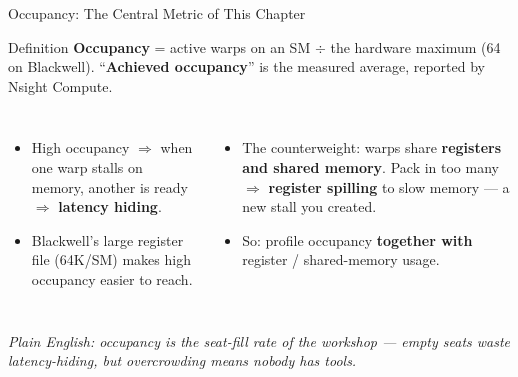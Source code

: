 \documentclass[aspectratio=169]{beamer}
\newcommand{\kw}[1]{\textbf{\textcolor{kwblue}{#1}}}
\newcommand{\pe}[1]{{\footnotesize\itshape Plain English: #1}}
\begin{document}
\begin{frame}{Occupancy: The Central Metric of This Chapter}
  \begin{block}{Definition}
    \kw{Occupancy} = active warps on an SM $\div$ the hardware maximum (64 on Blackwell).
    ``\kw{Achieved occupancy}'' is the measured average, reported by Nsight Compute.
  \end{block}
  \begin{columns}[t]
    \begin{itemize}
      \item High occupancy $\Rightarrow$ when one warp stalls on memory, another is ready
            $\Rightarrow$ \kw{latency hiding}.
      \item Blackwell's large register file (64K/SM) makes high occupancy easier to reach.
    \end{itemize}
    \begin{itemize}
      \item The counterweight: warps share \kw{registers and shared memory}. Pack in too many
            $\Rightarrow$ \kw{register spilling} to slow memory --- a new stall you created.
      \item So: profile occupancy \kw{together with} register / shared-memory usage.
    \end{itemize}
  \end{columns}
  \medskip
  \pe{occupancy is the seat-fill rate of the workshop --- empty seats waste latency-hiding, but overcrowding means nobody has tools.}
\end{frame}
\end{document}
